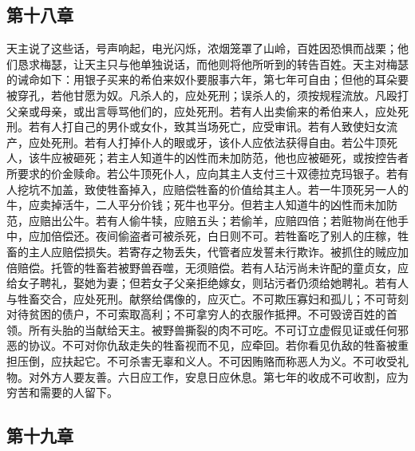 
\subsection{第十八章}

天主说了这些话，号声响起，电光闪烁，浓烟笼罩了山岭，百姓因恐惧而战栗；他们恳求梅瑟，让天主只与他单独说话，而他则将他所听到的转告百姓。天主对梅瑟的诫命如下：用银子买来的希伯来奴仆要服事六年，第七年可自由；但他的耳朵要被穿孔，若他甘愿为奴。凡杀人的，应处死刑；误杀人的，须按规程流放。凡殴打父亲或母亲，或出言辱骂他们的，应处死刑。若有人出卖偷来的希伯来人，应处死刑。若有人打自己的男仆或女仆，致其当场死亡，应受审讯。若有人致使妇女流产，应处死刑。若有人打掉仆人的眼或牙，该仆人应依法获得自由。若公牛顶死人，该牛应被砸死；若主人知道牛的凶性而未加防范，他也应被砸死，或按控告者所要求的价金赎命。若公牛顶死仆人，应向其主人支付三十双德拉克玛银子。若有人挖坑不加盖，致使牲畜掉入，应赔偿牲畜的价值给其主人。若一牛顶死另一人的牛，应卖掉活牛，二人平分价钱；死牛也平分。但若主人知道牛的凶性而未加防范，应赔出公牛。若有人偷牛犊，应赔五头；若偷羊，应赔四倍；若赃物尚在他手中，应加倍偿还。夜间偷盗者可被杀死，白日则不可。若牲畜吃了别人的庄稼，牲畜的主人应赔偿损失。若寄存之物丢失，代管者应发誓未行欺诈。被抓住的贼应加倍赔偿。托管的牲畜若被野兽吞噬，无须赔偿。若有人玷污尚未许配的童贞女，应给女子聘礼，娶她为妻；但若女子父亲拒绝嫁女，则玷污者仍须给她聘礼。若有人与牲畜交合，应处死刑。献祭给偶像的，应灭亡。不可欺压寡妇和孤儿；不可苛刻对待贫困的债户，不可索取高利；不可拿穷人的衣服作抵押。不可毁谤百姓的首领。所有头胎的当献给天主。被野兽撕裂的肉不可吃。不可订立虚假见证或任何邪恶的协议。不可对你仇敌走失的牲畜视而不见，应牵回。若你看见仇敌的牲畜被重担压倒，应扶起它。不可杀害无辜和义人。不可因贿赂而称恶人为义。不可收受礼物。对外方人要友善。六日应工作，安息日应休息。第七年的收成不可收割，应为穷苦和需要的人留下。\par


\subsection{第十九章}

